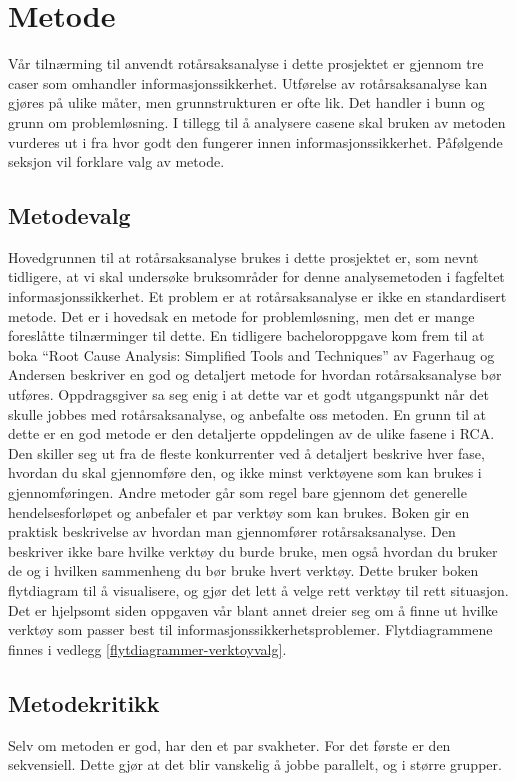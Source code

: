 \chapter{Metode}
\label{kap:metode}
Vår tilnærming til anvendt rotårsaksanalyse i dette prosjektet er gjennom tre caser som omhandler informasjonssikkerhet. Utførelse av rotårsaksanalyse kan gjøres på ulike måter, men grunnstrukturen er ofte lik. Det handler i bunn og grunn om problemløsning. I tillegg til å analysere casene skal bruken av metoden vurderes ut i fra hvor godt den fungerer innen informasjonssikkerhet. Påfølgende seksjon vil forklare valg av metode. 

\section{Metodevalg}
Hovedgrunnen til at rotårsaksanalyse brukes i dette prosjektet er, som nevnt tidligere, at vi skal undersøke bruksområder for denne analysemetoden i fagfeltet informasjonssikkerhet. Et problem er at rotårsaksanalyse er ikke en standardisert metode. Det er i hovedsak en metode for problemløsning, men det er mange foreslåtte tilnærminger til dette. En tidligere bacheloroppgave \cite{RCARapport} kom frem til at boka ``Root Cause Analysis: Simplified Tools and Techniques'' av Fagerhaug og Andersen \cite{RCA} beskriver en god og detaljert metode for hvordan rotårsaksanalyse bør utføres. Oppdragsgiver sa seg enig i at dette var et godt utgangspunkt når det skulle jobbes med rotårsaksanalyse, og anbefalte oss metoden. En grunn til at dette er en god metode er den detaljerte oppdelingen av de ulike fasene i RCA. Den skiller seg ut fra de fleste konkurrenter ved å detaljert beskrive hver fase, hvordan du skal gjennomføre den, og ikke minst verktøyene som kan brukes i gjennomføringen. Andre metoder går som regel bare gjennom det generelle hendelsesforløpet og anbefaler et par verktøy som kan brukes. Boken gir en praktisk beskrivelse av hvordan man gjennomfører rotårsaksanalyse. Den beskriver ikke bare hvilke verktøy du burde bruke, men også hvordan du bruker de og i hvilken sammenheng du bør bruke hvert verktøy. Dette bruker boken flytdiagram til å visualisere, og gjør det lett å velge rett verktøy til rett situasjon. Det er hjelpsomt siden oppgaven vår blant annet dreier seg om å finne ut hvilke verktøy som passer best til informasjonssikkerhetsproblemer. Flytdiagrammene finnes i vedlegg \ref{flytdiagrammer-verktoyvalg}.

\section{Metodekritikk}
Selv om metoden er god, har den et par svakheter. For det første er den sekvensiell. Dette gjør at det blir vanskelig å jobbe parallelt, og i større grupper. 